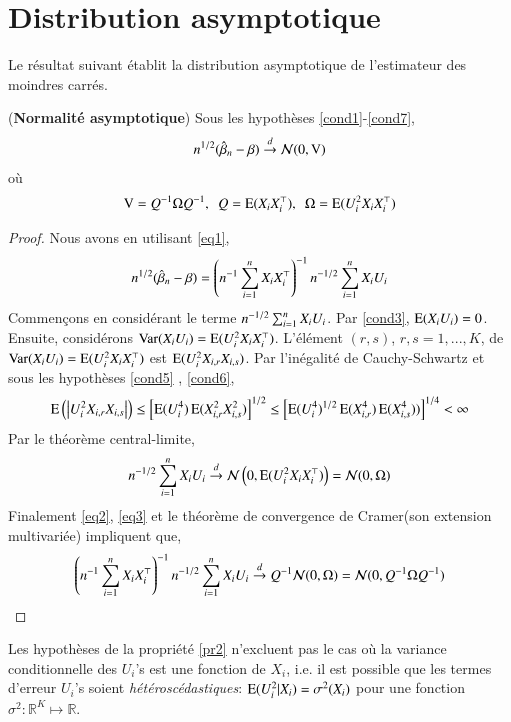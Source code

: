 \documentclass[10pt, reqno]{amsart}
\begin{document}
\section{Distribution asymptotique}
Le résultat suivant établit la distribution asymptotique de l'estimateur des moindres carrés.
\begin{propriete}\label{pr2}(\textbf{Normalité asymptotique})
Sous les hypothèses \ref{cond1}-\ref{cond7},
\begin{align*}
n^{1/2}(\hat{\beta}_n- \beta) \overset{d}{\rightarrow} \mathcal{N}(0, \operatorname{V})
\end{align*}
où
\begin{align*}
\operatorname{V} = Q^{-1} \Omega Q^{-1}, \ \ Q = \operatorname{E}(X_iX_i^\top), \ \ \Omega =  \operatorname{E}(U_i^2X_iX_i^\top)
\end{align*}
\end{propriete}
\begin{proof}
Nous avons en utilisant \eqref{eq1},
\begin{align*}
n^{1/2}(\hat{\beta}_n- \beta) = \left(n^{-1}\sum_{i=1}^n X_iX_i^\top\right)^{-1}n^{-1/2}\sum_{i=1}^n X_iU_i 
\end{align*}
Commençons en considérant le terme $n^{-1/2}\sum_{i=1}^n X_iU_i$. Par \ref{cond3}, $\operatorname{E}(X_iU_i) = 0$. Ensuite, considérons 
$\operatorname{Var}(X_iU_i) = \operatorname{E}(U_i^2X_iX_i^\top)$.    
L'élément  $(r, s)$, $r,s = 1,...,K$, de $\operatorname{Var}(X_iU_i) = \operatorname{E}(U_i^2X_iX_i^\top)$ est $\operatorname{E}(U_i^2X_{i,r}X_{i,s})$.  
Par l'inégalité de Cauchy-Schwartz et sous les hypothèses \ref{cond5} , \ref{cond6},
\begin{align*}
\operatorname{E}\left(\left\vert {U_i^2 X_{i,r}  X_{i,s}} \right\vert\right) \leq \left[\operatorname{E}(U_i^4)\operatorname{E}(X_{i,r}^2X_{i,s}^2)\right]^{1/2} \leq  \left[\operatorname{E}(U_i^4)^{1/2}
\operatorname{E}(X_ {i,r}^4)\operatorname{E}(X_{i,s}^4))\right]^{1/4} < \infty 
\end{align*}
Par le théorème central-limite,
\begin{align}
n^{-1/2}\sum_{i=1}^n X_iU_i  \overset{d}{\rightarrow} \mathcal{N}\left(0, \operatorname{E}(U_i^2X_iX_i^\top)\right) = \mathcal{N}(0, \Omega)
\label{eq3}
\end{align}
Finalement \eqref{eq2}, \eqref{eq3} et le théorème de convergence de Cramer(son extension multivariée) impliquent que,
\begin{align*}
\left(n^{-1}\sum_{i=1}^n X_iX_i^\top\right)^{-1}n^{-1/2}\sum_{i=1}^n X_iU_i \overset{d}{\rightarrow} Q^{-1} \mathcal{N}(0, \Omega) = \mathcal{N}(0, Q^{-1}\Omega Q^{-1})
\end{align*}
\end{proof}
\begin{remarque}\label{re1}
Les hypothèses de la propriété \ref{pr2} n'excluent pas le cas où la variance conditionnelle des $U_i$'s est une fonction de $X_i$, i.e. il est possible que les termes d'erreur $U_i$'s soient \emph{hétéroscédastiques}: $\operatorname{E}(U_i^2|X_i) = \sigma^2(X_i)$ pour une fonction $\sigma^2: \mathbb{R}^K \mapsto \mathbb{R}$.
\end{remarque}
\end{document}
